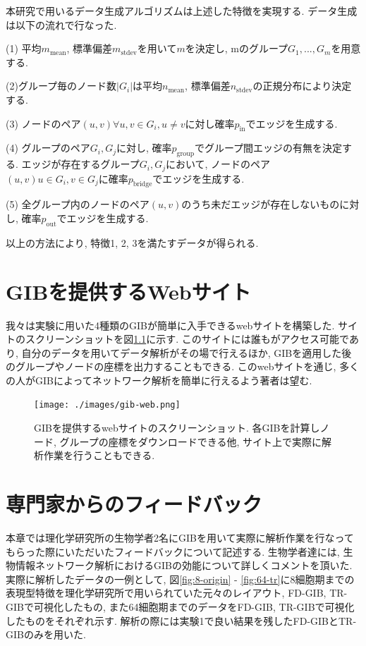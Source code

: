 \documentclass{kuee}
\begin{document}
本研究で用いるデータ生成アルゴリズムは上述した特徴を実現する.
データ生成は以下の流れで行なった.
\begin{description}
  \item{(1)} 平均$m_{\text{mean}}$, 標準偏差$m_{\text{stdev}}$を用いて$m$を決定し, mのグループ${G_1, ..., G_m}$を用意する.
  \item{(2)}グループ毎のノード数$|G_i|$は平均$n_{\text{mean}}$, 標準偏差$n_{\text{stdev}}$の正規分布により決定する.
  \item{(3)} ノードのペア$(u, v) \forall u,v \in G_i, u \neq v$に対し確率$p_{\text{in}}$でエッジを生成する.
  \item{(4)} グループのペア$G_i, G_j$に対し, 確率$p_{\text{group}}$でグループ間エッジの有無を決定する.
  エッジが存在するグループ$G_i, G_j$において, ノードのペア$(u, v) u \in G_i, v \in G_j$に確率$p_{\text{bridge}}$でエッジを生成する.
  \item{(5)} 全グループ内のノードのペア$(u, v)$のうち未だエッジが存在しないものに対し, 確率$p_{\text{out}}$でエッジを生成する.
\end{description}
以上の方法により, 特徴1, 2, 3を満たすデータが得られる.

\chapter{GIBを提供するWebサイト}
\label{chap:website}
我々は実験に用いた4種類のGIBが簡単に入手できるwebサイト\cite{gibweb}を構築した.
サイトのスクリーンショットを図\ref{fig:website}に示す.
このサイトには誰もがアクセス可能であり, 自分のデータを用いてデータ解析がその場で行えるほか, GIBを適用した後のグループやノードの座標を出力することもできる.
このwebサイトを通じ, 多くの人がGIBによってネットワーク解析を簡単に行えるよう著者は望む.

\begin{figure}[t]
  \begin{center}
  \texttt{[image: ./images/gib-web.png]}
  \caption{GIBを提供するwebサイトのスクリーンショット. 各GIBを計算しノード, グループの座標をダウンロードできる他, サイト上で実際に解析作業を行うこともできる. \label{fig:website}}
  \end{center}
\end{figure}

\chapter{専門家からのフィードバック}
\label{chap:feedback}

本章では理化学研究所の生物学者2名にGIBを用いて実際に解析作業を行なってもらった際にいただいたフィードバックについて記述する.
生物学者達には, 生物情報ネットワーク解析におけるGIBの効能について詳しくコメントを頂いた.
実際に解析したデータの一例として, 図\ref{fig:8-origin} - \ref{fig:64-tr}に8細胞期までの表現型特徴を理化学研究所で用いられていた元々のレイアウト, FD-GIB, TR-GIBで可視化したもの, また64細胞期までのデータをFD-GIB, TR-GIBで可視化したものをそれぞれ示す.
解析の際には実験1で良い結果を残したFD-GIBとTR-GIBのみを用いた.
\end{document}
